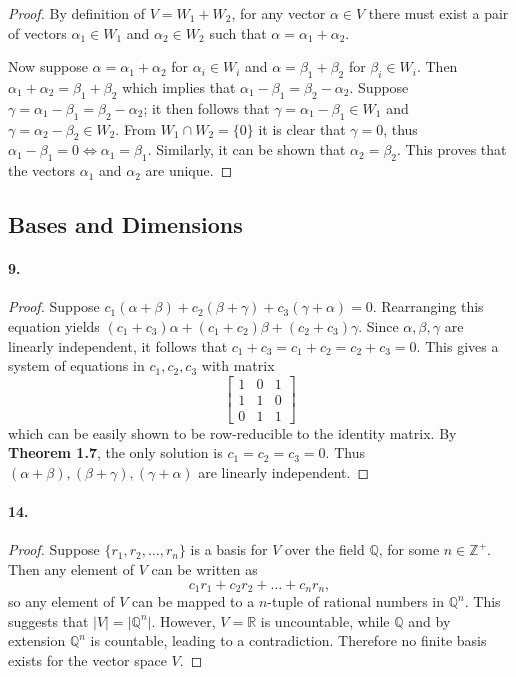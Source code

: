\documentclass{article}
\begin{document}
\begin{proof}
  By definition of $V = W_1 + W_2$, for any vector $\alpha \in V$ there must
  exist a pair of vectors $\alpha_1 \in W_1$ and $\alpha_2 \in W_2$ such that
  $\alpha = \alpha_1 + \alpha_2$.

  Now suppose $\alpha = \alpha_1 + \alpha_2$ for $\alpha_i \in W_i$ and $\alpha
  = \beta_1 + \beta_2$ for $\beta_i \in W_i$. Then $\alpha_1 + \alpha_2 =
  \beta_1 + \beta_2$ which implies that $\alpha_1 - \beta_1 = \beta_2 -
  \alpha_2$. Suppose $\gamma = \alpha_1 - \beta_1 = \beta_2 - \alpha_2$; it then
  follows that $\gamma = \alpha_1 - \beta_1 \in W_1$ and $\gamma = \alpha_2 -
  \beta_2 \in W_2$. From $W_1 \cap W_2 = \{0\}$ it is clear that $\gamma = 0$,
  thus $\alpha_1 - \beta_1 = 0 \iff \alpha_1 = \beta_1$. Similarly, it can be
  shown that $\alpha_2 = \beta_2$. This proves that the vectors $\alpha_1$ and
  $\alpha_2$ are unique.
\end{proof}

\subsection{Bases and Dimensions}

\paragraph{9.}

\begin{proof}
  Suppose $c_1(\alpha + \beta) + c_2(\beta + \gamma) + c_3(\gamma + \alpha) =
  0$. Rearranging this equation yields $(c_1 + c_3)\alpha + (c_1 + c_2) \beta +
  (c_2 + c_3)\gamma$. Since $\alpha, \beta, \gamma$ are linearly independent, it
  follows that $c_1 + c_3 = c_1 + c_2 = c_2 + c_3 = 0$. This gives a system of
  equations in $c_1, c_2, c_3$ with matrix \[
    \begin{bmatrix}
      1 & 0 & 1 \\
      1 & 1 & 0 \\
      0 & 1 & 1
    \end{bmatrix}
  \] which can be easily shown to be row-reducible to the identity matrix. By
  \textbf{Theorem 1.7}, the only solution is $c_1 = c_2 = c_3 = 0$. Thus
  $(\alpha + \beta), (\beta + \gamma), (\gamma + \alpha)$ are linearly
  independent.
\end{proof}

\paragraph{14.}

\begin{proof}
  Suppose $\{r_1, r_2, \ldots, r_n\}$ is a basis for $V$ over the field
  $\mathbb{Q}$, for some $n \in \mathbb{Z}^+$. Then any element of $V$ can be
  written as \[
    c_1r_1 + c_2r_2 + \ldots + c_nr_n,
  \] so any element of $V$ can be mapped to a $n$-tuple of rational numbers in
  $\mathbb{Q}^n$. This suggests that $\vert V \vert = \vert \mathbb{Q}^n \vert$.
  However, $V = \mathbb{R}$ is uncountable, while $\mathbb{Q}$ and by extension
  $\mathbb{Q}^n$ is countable, leading to a contradiction. Therefore no finite
  basis exists for the vector space $V$.
\end{proof}
\end{document}
